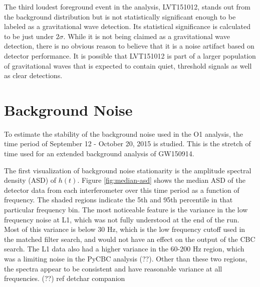 The third loudest foreground event in the analysis, LVT151012, stands out 
from the background distribution but is not statistically significant 
enough to be labeled as a gravitational wave detection. Its statistical 
significance is calculated to be just under $2\sigma$. While it is not 
being claimed as a gravitational wave detection, there is no obvious 
reason to believe that it is a noise artifact based on detector 
performance. It is possible that LVT151012 is part of a larger 
population of gravitational waves that is expected to contain 
quiet, threshold signals as well as clear detections.

\section{Background Noise}

To estimate the stability of the background noise used in the O1 
analysis, the time period of September 12 - October 20, 2015 is 
studied. This is the stretch 
of time used for an extended background analysis of GW150914. 

The first 
visualization of background noise stationarity is the amplitude 
spectral density (ASD) of $h(t)$. Figure \ref{fig:median-asd} 
shows the 
median ASD of the detector data from each interferometer over this 
time period as a function of frequency. The shaded regions indicate 
the 5th and 95th percentile in that particular frequency bin. 
The most noticeable feature is the variance in the low frequency 
noise at L1, which was not fully understood at the end of the run. 
Most of this variance is below 30 Hz, which is the 
low frequency cutoff used in the matched filter search, and would 
not have an effect on the output of the CBC search. The L1 data 
also had a higher variance in the 60-200 Hz region, which was a 
limiting noise in the PyCBC analysis (??). Other than these two regions, 
the spectra appear to be consistent and have reasonable variance 
at all frequencies. (??) ref detchar companion


